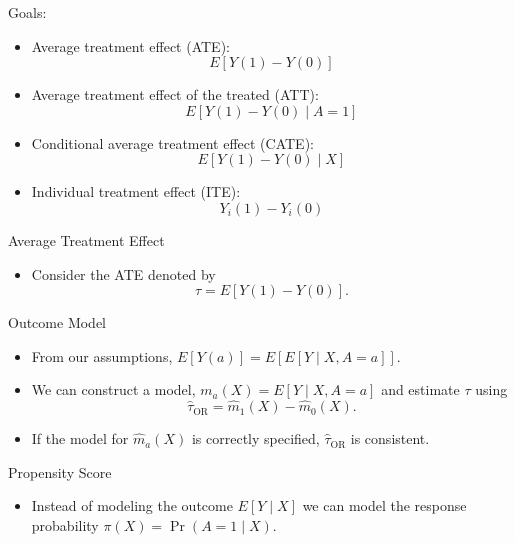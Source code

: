 \documentclass[handout]{beamer} %
\begin{document}
\begin{frame}{Goals:}

\begin{itemize}
    \item Average treatment effect (ATE): 
    \[E[Y(1) - Y(0)]\]
    \item Average treatment effect of the treated (ATT): 
    \[E[Y(1) - Y(0) \mid A = 1]\]
    \item Conditional average treatment effect (CATE):
    \[E[Y(1) - Y(0) \mid X]\]
    \item Individual treatment effect (ITE): 
    \[Y_i(1) - Y_i(0)\]
\end{itemize}

\end{frame}

\begin{frame}{Average Treatment Effect}

\begin{itemize}
    \item Consider the ATE denoted by 
    \[\tau = E[Y(1) - Y(0)].\]
\end{itemize}
    
\end{frame}

\begin{frame}{Outcome Model}

\begin{itemize}
    \item From our assumptions, $E[Y(a)] = E[E[Y \mid X, A = a]]$.
    \item We can construct a model, $m_a(X) = E[Y \mid X, A = a]$ and estimate
      $\tau$ using
    \[\hat \tau_{\text{OR}} = \hat m_1(X) - \hat m_0(X).\]
    \item If the model for $\hat m_a(X)$ is correctly specified, 
      $\hat \tau_{\text{OR}}$ is consistent.
\end{itemize}

\end{frame}

\begin{frame}{Propensity Score}

\begin{itemize}
    \item Instead of modeling the outcome $E[Y \mid X]$ we can model the 
    response probability $\pi(X) = \Pr(A = 1 \mid X)$.
\end{itemize}

\end{frame}
\end{document}
